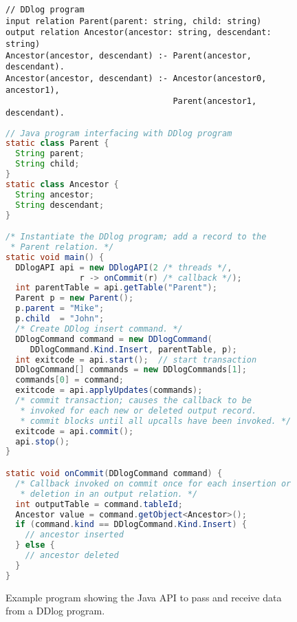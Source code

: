 \begin{figure}[t]
  \footnotesize
  \begin{lstlisting}[language=ddlog]
// DDlog program    
input relation Parent(parent: string, child: string)
output relation Ancestor(ancestor: string, descendant: string)
Ancestor(ancestor, descendant) :- Parent(ancestor, descendant).
Ancestor(ancestor, descendant) :- Ancestor(ancestor0, ancestor1),
                                  Parent(ancestor1, descendant).
  \end{lstlisting}
  
  \begin{lstlisting}[language=Java]
// Java program interfacing with DDlog program    
static class Parent {
  String parent;
  String child;
}
static class Ancestor {
  String ancestor;
  String descendant;
}

/* Instantiate the DDlog program; add a record to the
 * Parent relation. */
static void main() {
  DDlogAPI api = new DDlogAPI(2 /* threads */,
               r -> onCommit(r) /* callback */);
  int parentTable = api.getTable("Parent");
  Parent p = new Parent();
  p.parent = "Mike";
  p.child  = "John";
  /* Create DDlog insert command. */
  DDlogCommand command = new DDlogCommand(
     DDlogCommand.Kind.Insert, parentTable, p);
  int exitcode = api.start();  // start transaction
  DDlogCommand[] commands = new DDlogCommands[1];
  commands[0] = command;
  exitcode = api.applyUpdates(commands);
  /* commit transaction; causes the callback to be 
   * invoked for each new or deleted output record.
   * commit blocks until all upcalls have been invoked. */
  exitcode = api.commit();
  api.stop();
}

static void onCommit(DDlogCommand command) {
  /* Callback invoked on commit once for each insertion or
   * deletion in an output relation. */
  int outputTable = command.tableId;
  Ancestor value = command.getObject<Ancestor>();
  if (command.kind == DDlogCommand.Kind.Insert) {
    // ancestor inserted
  } else {
    // ancestor deleted
  }
}
\end{lstlisting}
\caption{Example program showing the Java API to pass and receive data
  from a DDlog program.\label{fig:javaapi}}
\end{figure}
